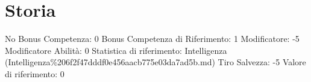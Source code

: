 \section{Storia}\label{storia}

\begin{description}
\tightlist
\item[Tags: ABI]
No Bonus Competenza: 0 Bonus Competenza di Riferimento: 1 Modificatore:
-5 Modificatore Abilità: 0 Statistica di riferimento: Intelligenza
(Intelligenza\%206f2f47dddf0e456aacb775e03da7ad5b.md) Tiro Salvezza: -5
Valore di riferimento: 0
\end{description}
